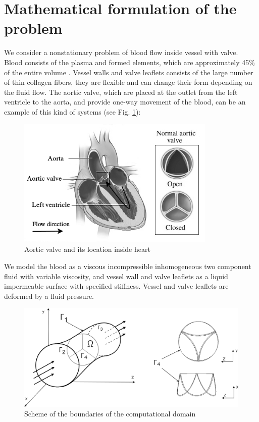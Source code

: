 \documentclass[runningheads,a4paper]{llncs}
\begin{document}
\section{Mathematical formulation of the problem}

We consider a nonstationary problem of blood flow inside vessel with valve. Blood consists of the plasma and formed elements, which are approximately
45\% of the entire volume \cite{caro}. Vessel walls and valve leaflets consists of the large number of thin collagen fibers, they are flexible
and can change their form depending on the fluid flow. The aortic valve, which are placed at the outlet from the left ventricle to the aorta, and provide
one-way movement of the blood, can be an example of this kind of systems (see Fig. \ref{fig:aortic_valve_example}):

\begin{figure}
\centering
\includegraphics[height=6.2cm]{images/aorta_scheme_gray.png}
\caption{Aortic valve and its location inside heart}
\label{fig:aortic_valve_example}
\end{figure}

We model the blood as a viscous incompressible inhomogeneous two component fluid with variable viscosity, and vessel wall and valve leaflets as a
liquid impermeable surface with specified stiffness. Vessel and valve leaflets are deformed by a fluid pressure.

\begin{figure}
\centering
\includegraphics[width=12.5cm]{images/area_3d.png}
\caption{Scheme of the boundaries of the computational domain}
\label{fig:area_3d}
\end{figure}
\end{document}
